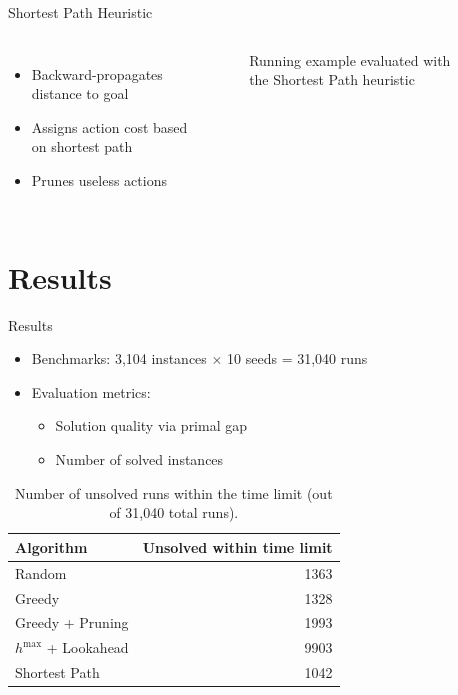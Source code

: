 \documentclass[aspectratio=169,xcolor=dvipsnames]{beamer}
\begin{document}
\begin{frame}{Shortest Path Heuristic}
	\begin{columns}[c]
		\begin{itemize}
			\item Backward-propagates distance to goal
			\item Assigns action cost based on shortest path
			\item Prunes useless actions
		\end{itemize}
		\begin{figure}[ht]
			\centering
			\def\svgwidth{\linewidth}
			
			\caption{Running example evaluated with the Shortest Path heuristic}
			\label{fig:sp_scheme}
		\end{figure}
	\end{columns}
\end{frame}

\section{Results}

\begin{frame}{Results}
	\begin{itemize}
		\item Benchmarks: 3,104 instances $\times$ 10 seeds = 31,040 runs
		\item Evaluation metrics:
		      \begin{itemize}
			      \item Solution quality via primal gap
			      \item Number of solved instances
		      \end{itemize}
	\end{itemize}

	\begin{table}[ht]
		\centering
		\begin{tabular}{|l|r|}
			\hline
			\textbf{Algorithm}     & \textbf{Unsolved within time limit} \\
			\hline
			Random                 & 1363                                \\
			Greedy                 & 1328                                \\
			Greedy + Pruning       & 1993                                \\
			$h^{\max}$ + Lookahead & 9903                                \\
			Shortest Path          & 1042                                \\
			\hline
		\end{tabular}
		\caption{Number of unsolved runs within the time limit (out of 31,040 total runs).}
		\label{tab:timelimit}
	\end{table}
\end{frame}
\end{document}
